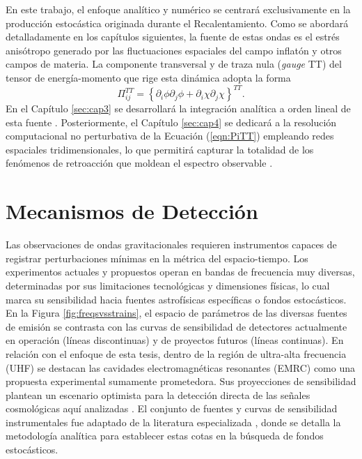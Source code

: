 En este trabajo, el enfoque analítico y numérico se centrará exclusivamente en la producción estocástica originada durante el Recalentamiento. Como se abordará detalladamente en los capítulos siguientes, la fuente de estas ondas es el estrés anisótropo generado por las fluctuaciones espaciales del campo inflatón y otros campos de materia. La componente transversal y de traza nula (\textit{gauge} TT) del tensor de energía-momento que rige esta dinámica adopta la forma
\begin{equation}\label{eqn:PiTT}
    \Pi_{ij}^{TT} = \left\{ \partial_i \phi \partial_j \phi + \partial_i \chi \partial_j \chi \right\}^{TT}.
\end{equation}
En el Capítulo \ref{sec:cap3} se desarrollará la integración analítica a orden lineal de esta fuente \cite{Dufaux_2007, Figueroa_2017_GW}. Posteriormente, el Capítulo \ref{sec:cap4} se dedicará a la resolución computacional no perturbativa de la Ecuación (\ref{eqn:PiTT}) empleando redes espaciales tridimensionales, lo que permitirá capturar la totalidad de los fenómenos de retroacción que moldean el espectro observable \cite{Figueroa2021, Figueroa2023}.

\section{Mecanismos de Detección}

Las observaciones de ondas gravitacionales requieren instrumentos capaces de registrar perturbaciones mínimas en la métrica del espacio-tiempo. Los experimentos actuales y propuestos operan en bandas de frecuencia muy diversas, determinadas por sus limitaciones tecnológicas y dimensiones físicas, lo cual marca su sensibilidad hacia fuentes astrofísicas específicas o fondos estocásticos. En la Figura \ref{fig:freqsvsstrains}, el espacio de parámetros de las diversas fuentes de emisión se contrasta con las curvas de sensibilidad de detectores actualmente en operación (líneas discontinuas) y de proyectos futuros (líneas continuas). En relación con el enfoque de esta tesis, dentro de la región de ultra-alta frecuencia (UHF) se destacan las cavidades electromagnéticas resonantes (EMRC) como una propuesta experimental sumamente prometedora. Sus proyecciones de sensibilidad plantean un escenario optimista para la detección directa de las señales cosmológicas aquí analizadas \cite{Mohanty_2026}. El conjunto de fuentes y curvas de sensibilidad instrumentales fue adaptado de la literatura especializada \cite{Aggarwal_2020, Domcke_2023, EinsteinTelescope_2025, Moore_2015}, donde se detalla la metodología analítica para establecer estas cotas en la búsqueda de fondos estocásticos.

